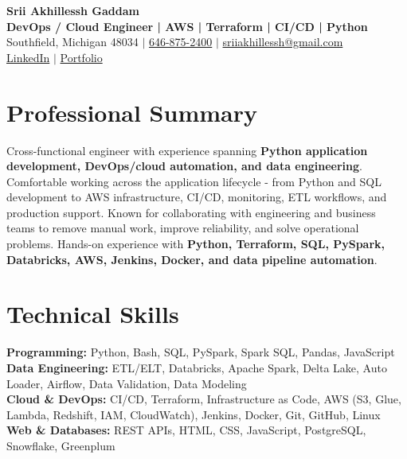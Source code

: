 \documentclass[letterpaper,10pt]{article}
\begin{document}
\fontsize{9.35pt}{10.45pt}\selectfont

\begin{center}
    {\LARGE \textbf{Srii Akhillessh Gaddam}} \\[-1pt]
    \textbf{DevOps / Cloud Engineer | AWS | Terraform | CI/CD | Python} \\[2pt]
    Southfield, Michigan 48034 $|$
    \href{tel:6468752400}{646-875-2400} $|$
    \href{mailto:sriiakhillessh@gmail.com}{sriiakhillessh@gmail.com} \\[1pt]
    \href{https://www.linkedin.com/in/srii-akhiilessh-gaddam-b48668191/}{LinkedIn} $|$
    \href{https://sriiakhillesshg.github.io/portfolio/}{Portfolio}
\end{center}
\vspace{-8pt}

\section{Professional Summary}
\small{Cross-functional engineer with experience spanning \textbf{Python application development, DevOps/cloud automation, and data engineering}. Comfortable working across the application lifecycle - from Python and SQL development to AWS infrastructure, CI/CD, monitoring, ETL workflows, and production support. Known for collaborating with engineering and business teams to remove manual work, improve reliability, and solve operational problems. Hands-on experience with \textbf{Python, Terraform, SQL, PySpark, Databricks, AWS, Jenkins, Docker, and data pipeline automation}.}

\section{Technical Skills}
\small{
\textbf{Programming:} Python, Bash, SQL, PySpark, Spark SQL, Pandas, JavaScript \\
\textbf{Data Engineering:} ETL/ELT, Databricks, Apache Spark, Delta Lake, Auto Loader, Airflow, Data Validation, Data Modeling \\
\textbf{Cloud \& DevOps:} CI/CD, Terraform, Infrastructure as Code, AWS (S3, Glue, Lambda, Redshift, IAM, CloudWatch), Jenkins, Docker, Git, GitHub, Linux \\
\textbf{Web \& Databases:} REST APIs, HTML, CSS, JavaScript, PostgreSQL, Snowflake, Greenplum
}
\end{document}

